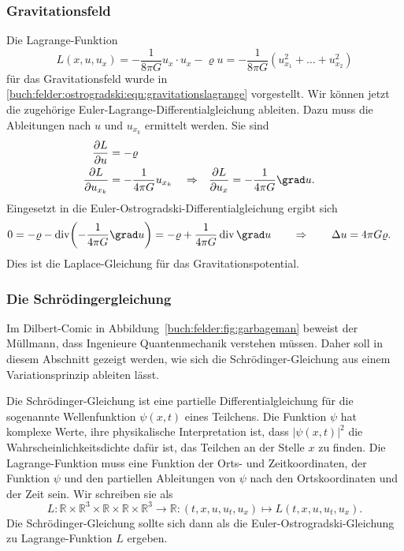 %
%
\subsubsection{Gravitationsfeld}
Die Lagrange-Funktion
\[
L(x,u,u_x)
=
-\frac{1}{8\pi G}
u_x\cdot u_x 
-\varrho u
=
-\frac{1}{8\pi G}
(u_{x_1}^2 + \dots + u_{x_2}^2)
\]
für das Gravitationsfeld wurde in
\eqref{buch:felder:ostrogradski:eqn:gravitationslagrange}
vorgestellt.
Wir können jetzt die zugehörige Euler-Lagrange-Differentialgleichung
ableiten.
Dazu muss die Ableitungen nach $u$ und $u_{x_k}$ ermittelt werden.
Sie sind
\begin{align*}
\frac{\partial L}{\partial u}
&=
-\varrho
\\
\frac{\partial L}{\partial u_{x_k}}
&=
-\frac{1}{4\pi G}u_{x_k}
&&\Rightarrow&
\frac{\partial L}{\partial u_x}
&=
-\frac{1}{4\pi G}\grad u.
\end{align*}
Eingesetzt in die Euler-Ostrogradski-Differentialgleichung ergibt sich
\begin{align*}
0
&=
-\varrho
-
\operatorname{div} \biggl(-\frac{1}{4\pi G}\grad u\biggr)
=
-\varrho + \frac{1}{4\pi G} \operatorname{div}\grad u
\qquad\Rightarrow\qquad
\Delta u = 4\pi G\varrho.
\end{align*}
Dies ist die Laplace-Gleichung für das Gravitationspotential.

%
%
\subsubsection{Die Schrödingergleichung}

Im Dilbert-Comic in Abbildung~\ref{buch:felder:fig:garbageman} beweist
der Müllmann, dass Ingenieure Quantenmechanik verstehen müssen.
Daher soll in diesem Abschnitt gezeigt werden, wie sich die
Schrödinger-Gleichung aus einem Variationsprinzip ableiten lässt.

Die Schrödinger-Gleichung ist eine partielle Differentialgleichung
für die sogenannte Wellenfunktion $\psi(x,t)$ eines Teilchens.
Die Funktion $\psi$ hat komplexe Werte, ihre physikalische
Interpretation ist, dass $|\psi(x,t)|^2$ die Wahrscheinlichkeitsdichte
dafür ist, das Teilchen an der Stelle $x$ zu finden.
Die Lagrange-Funktion muss eine Funktion der Orts- und Zeitkoordinaten,
der Funktion $\psi$ und den partiellen Ableitungen von $\psi$ nach
den Ortskoordinaten und der Zeit sein.
Wir schreiben sie als
\[
L
\colon
\mathbb{R}\times \mathbb{R}^3\times
\mathbb{R}\times
\mathbb{R}\times\mathbb{R}^3
\to\mathbb{R}
:
(t,x,u, u_t, u_x)
\mapsto
L(t,x,u, u_t, u_x).
\]
Die Schrödinger-Gleichung sollte sich dann als die Euler-Ostrogradski-Gleichung
zu La\-grange-Funktion $L$ ergeben.

